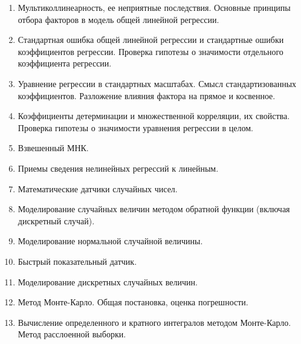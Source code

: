 \documentclass[12pt]{article}
\begin{document}
\begin{enumerate}
    \item Мультиколлинеарность, ее неприятные последствия. Основные принципы отбора факторов в модель общей линейной регрессии.
    \item Стандартная ошибка общей линейной регрессии и стандартные ошибки коэффициентов регрессии. Проверка гипотезы о значимости отдельного коэффициента регрессии.
    \item Уравнение регрессии в стандартных масштабах. Смысл стандартизованных коэффициентов. Разложение влияния фактора на прямое и косвенное.
    \item Коэффициенты детерминации и множественной корреляции, их свойства. Проверка гипотезы о значимости уравнения регрессии в целом.
    \item Взвешенный МНК.
    \item Приемы сведения нелинейных регрессий к линейным.
    \item Математические датчики случайных чисел.
    \item Моделирование случайных величин методом обратной функции (включая дискретный случай).
    \item Моделирование нормальной случайной величины.
    \item Быстрый показательный датчик.
    \item Моделирование дискретных случайных величин.
    \item Метод Монте-Карло. Общая постановка, оценка погрешности.
    \item Вычисление определенного и кратного интегралов методом Монте-Карло. Метод расслоенной выборки.
\end{enumerate}

\end{document}
